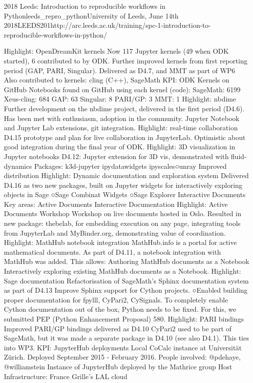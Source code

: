 \begin{Aim 1}
\begin{Aim 2}
\begin{event}{2018 Leeds: Introduction to reproducible workflows in Python}{leeds_repro_python}{University of Leeds, June 14th 2018}{LEEDS}{20}{1}{http://arc.leeds.ac.uk/training/spc-1-introduction-to-reproducible-workflows-in-python/}
\begin{itemize}
Highlight: OpenDreamKit kernels
Now 117 Jupyter kernels (49 when ODK started), 6 contributed to by ODK.
Further improved kernels from first reporting period (GAP, PARI, Singular). 
Delivered as D4.7, and MMT as part of WP6
Also contributed to kernels: cling (C++), SageMath
KPI: ODK Kernels on GitHub
Notebooks found on GitHub using each kernel (code):
SageMath: 6199
Xeus-cling: 684
GAP: 63
Singular: 8
PARI/GP: 3
MMT: 1
Highlight: nbdime
Further development on the nbdime project, delivered in the first period 
(D4.6). Has been met with enthusiasm, adoption in the community.
Jupyter Notebook and Jupyter Lab extensions, git integration.
Highlight: real-time collaboration
D4.15 prototype and plan for live collaboration in JupyterLab.
Optimistic about good integration during the final year of ODK.
Highlight: 3D visualization in Jupyter notebooks
D4.12: Jupyter extension for 3D vis, demonstrated with fluid-dynamics
Packages:
k3d-jupyter
ipydatawidgets
ipyscales○unray
Improved distribution
Highlight: Dynamic documentation and exploration system
Delivered D4.16 as two new packages, 
built on Jupyter widgets for interactively 
exploring objects in Sage
○Sage Combinat Widgets
○Sage Explorer
Interactive Documents
Key areas:
Active Documents
Interactive Documentation
Highlight: Active Documents Workshop
Workshop on live documents hosted in Oslo. Resulted in new package: 
thebelab, for embedding execution on any page, integrating tools from 
JupyterLab and MyBinder.org, demonstrating value of coordination.
Highlight: MathHub notebook integration
MathHub.info is a portal for active mathematical documents. As part of D4.11, a 
notebook integration with MathHub was added. This allows:
Authoring MathHub documents as a Notebook
Interactively exploring existing MathHub documents as a Notebook.
Highlight: Sage documentation
Refactorisation of SageMath’s Sphinx documentation system as part of D4.13
Improve Sphinx support for Cython projects.
○Enabled building proper documentation for fpylll, CyPari2, CySignals.
To completely enable Cython documentation out of the box, Python needs to 
be fixed. For this, we submitted PEP (Python Enhancement Proposal) 580.
Highlight: PARI bindings
Improved PARI/GP bindings delivered as D4.10
CyPari2 used to be part of SageMath, but it was made a separate package in 
D4.10 (see also D4.1). This ties into WP3.
KPI: JupyterHub deployments
Local CoCalc instance at Universität Zürich.
Deployed September 2015 - February 2016.
People involved: @pdehaye, @williamstein
Instance of JupyterHub
 deployed by the 
Mathrice group
Host Infrastructure: France Grille's LAL cloud

\end{itemize}
\end{event}
\end{Aim 2}
\end{Aim 1}
